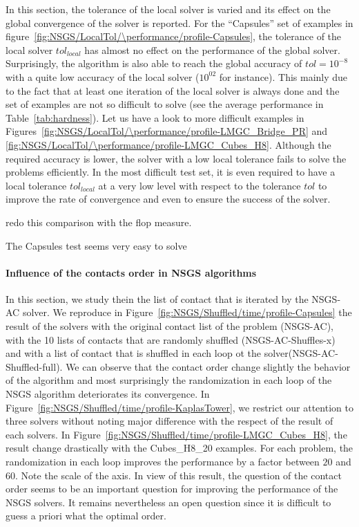 In this section, the tolerance of the local solver is varied and its effect on the global convergence of the solver is reported. For the ``Capsules'' set of examples in figure~\ref{fig:NSGS/LocalTol/\performance/profile-Capsules}, the tolerance of the local solver $tol_{local}$ has almost no effect on the performance of the global solver. Surprisingly, the algorithm is also able to reach the global accuracy of $tol = 10^{-8}$ with a quite low accuracy of the local solver ($10^{02}$ for instance). This mainly due to the fact that at least one iteration of the local solver is always done and the set of examples are not so difficult to solve (see the average performance in Table~\ref{tab:hardness}).
Let us have a look to more difficult examples in Figures~\ref{fig:NSGS/LocalTol/\performance/profile-LMGC_Bridge_PR} and \ref{fig:NSGS/LocalTol/\performance/profile-LMGC_Cubes_H8}. Although the required accuracy is lower, the solver with a low local tolerance fails to solve the problems efficiently. In the most difficult test set, it is even required to have a local tolerance $tol_{local}$ at a very low level with respect to the tolerance $tol$ to improve the rate of convergence and even to ensure the success of the solver.

\begin{ndrva}
  \item redo this comparison with the flop measure.
  \item The Capsules test seems very easy to solve
\end{ndrva}

\paragraph{Influence of the contacts order  in NSGS algorithms}

In this section, we study thein the list of contact that is iterated by the NSGS-AC solver. We reproduce in Figure~\ref{fig:NSGS/Shuffled/time/profile-Capsules} the result of the solvers with the original contact list of the problem (NSGS-AC), with the 10 lists of contacts that are randomly shuffled (NSGS-AC-Shuffles-x) and with a list of contact that is shuffled in each loop ot the solver(NSGS-AC-Shuffled-full). We can observe that the contact order change slightly the behavior of the algorithm and most surprisingly the randomization in each loop of the NSGS algorithm deteriorates its convergence. In Figure~\ref{fig:NSGS/Shuffled/time/profile-KaplasTower}, we restrict our attention to three solvers without noting major difference with the respect of the result of each solvers. In Figure~\ref{fig:NSGS/Shuffled/time/profile-LMGC_Cubes_H8}, the result change drastically with the Cubes\_H8\_20 examples. For each problem, the randomization  in each loop improves the performance by a factor between $20$ and $60$. Note the scale of the axis. In view of this result, the question of the contact order seems to be an important question for improving the performance of the NSGS solvers. It remains nevertheless an open question since it is difficult to guess a priori what the optimal order.


